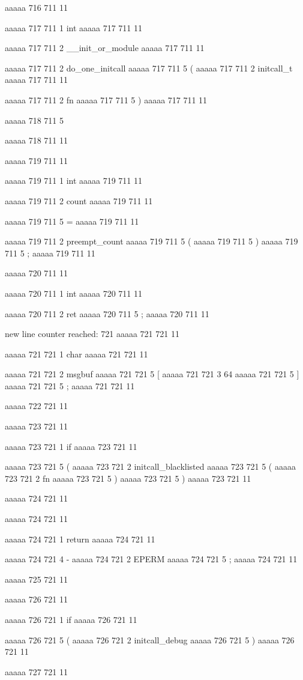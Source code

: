 aaaaa 716 711
11


aaaaa 717 711
1
int
aaaaa 717 711
11
 
aaaaa 717 711
2
__init_or_module
aaaaa 717 711
11
 
aaaaa 717 711
2
do_one_initcall
aaaaa 717 711
5
(
aaaaa 717 711
2
initcall_t
aaaaa 717 711
11
 
aaaaa 717 711
2
fn
aaaaa 717 711
5
)
aaaaa 717 711
11


aaaaa 718 711
5
{
aaaaa 718 711
11


aaaaa 719 711
11
	
aaaaa 719 711
1
int
aaaaa 719 711
11
 
aaaaa 719 711
2
count
aaaaa 719 711
11
 
aaaaa 719 711
5
=
aaaaa 719 711
11
 
aaaaa 719 711
2
preempt_count
aaaaa 719 711
5
(
aaaaa 719 711
5
)
aaaaa 719 711
5
;
aaaaa 719 711
11


aaaaa 720 711
11
	
aaaaa 720 711
1
int
aaaaa 720 711
11
 
aaaaa 720 711
2
ret
aaaaa 720 711
5
;
aaaaa 720 711
11


new line counter reached: 721
aaaaa 721 721
11
	
aaaaa 721 721
1
char
aaaaa 721 721
11
 
aaaaa 721 721
2
msgbuf
aaaaa 721 721
5
[
aaaaa 721 721
3
64
aaaaa 721 721
5
]
aaaaa 721 721
5
;
aaaaa 721 721
11


aaaaa 722 721
11


aaaaa 723 721
11
	
aaaaa 723 721
1
if
aaaaa 723 721
11
 
aaaaa 723 721
5
(
aaaaa 723 721
2
initcall_blacklisted
aaaaa 723 721
5
(
aaaaa 723 721
2
fn
aaaaa 723 721
5
)
aaaaa 723 721
5
)
aaaaa 723 721
11


aaaaa 724 721
11
	
aaaaa 724 721
11
	
aaaaa 724 721
1
return
aaaaa 724 721
11
 
aaaaa 724 721
4
-
aaaaa 724 721
2
EPERM
aaaaa 724 721
5
;
aaaaa 724 721
11


aaaaa 725 721
11


aaaaa 726 721
11
	
aaaaa 726 721
1
if
aaaaa 726 721
11
 
aaaaa 726 721
5
(
aaaaa 726 721
2
initcall_debug
aaaaa 726 721
5
)
aaaaa 726 721
11


aaaaa 727 721
11
	
}
